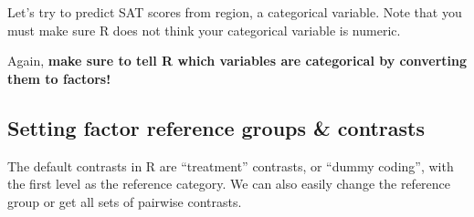 \documentclass[]{book}
\newenvironment{Shaded}{\begin{snugshade}}{\end{snugshade}}
\newcommand{\KeywordTok}[1]{\textcolor[rgb]{0.13,0.29,0.53}{\textbf{#1}}}
\newcommand{\DataTypeTok}[1]{\textcolor[rgb]{0.13,0.29,0.53}{#1}}
\newcommand{\DecValTok}[1]{\textcolor[rgb]{0.00,0.00,0.81}{#1}}
\newcommand{\StringTok}[1]{\textcolor[rgb]{0.31,0.60,0.02}{#1}}
\newcommand{\CommentTok}[1]{\textcolor[rgb]{0.56,0.35,0.01}{\textit{#1}}}
\newcommand{\OperatorTok}[1]{\textcolor[rgb]{0.81,0.36,0.00}{\textbf{#1}}}
\newcommand{\NormalTok}[1]{#1}
\begin{document}
Let's try to predict SAT scores from region, a categorical variable.
Note that you must make sure R does not think your categorical variable
is numeric.

\begin{Shaded}
\end{Shaded}

\begin{Shaded}
\end{Shaded}

Again, \textbf{make sure to tell R which variables are categorical by
converting them to factors!}

\subsection{Setting factor reference groups \&
contrasts}\label{setting-factor-reference-groups-contrasts}

The default contrasts in R are ``treatment'' contrasts, or ``dummy
coding'', with the first level as the reference category. We can also
easily change the reference group or get all sets of pairwise contrasts.
\end{document}
